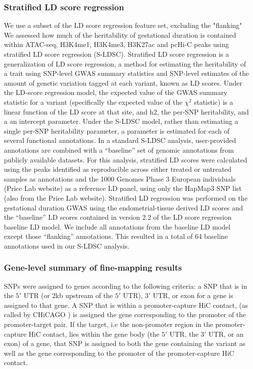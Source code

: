 \subsubsection*{Stratified LD score regression}
\label{sec:org3173e32}

We use a subset of the LD score regression feature set, excluding the "flanking"
We assessed how much of the heritability of  gestational duration is contained within ATAC-seq, H3K4me1, H3K4me3, H3K27ac and pcHi-C peaks using stratified LD score regression (S-LDSC).
Stratified LD score regression is a generalization of LD score regression, a method for estimating the heritability of a trait using SNP-level GWAS summary statistics and SNP-level estimates
 of the amount of genetic variation tagged at each variant, known as LD scores.  Under the LD-score regression model, the expected value of the GWAS summary statistic for a variant (specifically 
the expected value of the \(\chi^2\) statistic) is a linear function of the LD score at that site, and h2, the per-SNP heritability, and a an intercept parameter.  Under the S-LDSC model, rather than estimating a 
single per-SNP heritability parameter, a parameter is estimated for each of several functional annotations.  In a standard S-LDSC analysis, user-provided annotations are combined with a “baseline” set of genomic
 annotations from publicly available datasets.  For this analysis, stratified LD scores were calculated using the peaks identified as reproducible across either treated or untreated samples as annotations and the 
1000 Genomes Phase 3 European individuals (Price Lab website) as a reference LD panel, using only the HapMap3 SNP list (also from the Price Lab website). Stratified LD regression was performed on the gestational 
duration GWAS using the endometrial-tissue derived LD scores and the “baseline” LD scores contained in version 2.2 of the LD score regression baseline LD model. We include all annotations from the baseline LD model 
except those “flanking” annotations. This resulted in a total of 64 baseline annotations used in our S-LDSC analysis.  


\subsubsection*{Gene-level summary of fine-mapping results}
\label{sec:org3f48450}

SNPs were assigned to genes according to the following criteria:  a SNP that is in the \(5'\) UTR (or 2kb upstream of the \(5'\) UTR), \(3'\) UTR, or exon for a gene is assigned to that gene.
A SNP that is within a promoter-capture HiC contact, (as called by CHiCAGO \cite{chicago}) is assigned the gene corresponding to the promoter of the promoter-target pair.  If the target, i.e
the non-promoter region in the promoter-capture HiC contact, lies within the gene body (the \(5'\) UTR, the \(3'\) UTR, or an exon) of a gene, that SNP is assigned to both the gene containing the variant
as well as the gene corresponding to the promoter of the promoter-capture HiC contact.  



